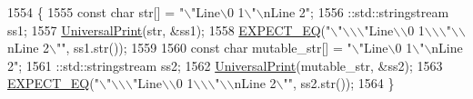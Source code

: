 \begin{DoxyCode}
1554                                             \{
1555   \textcolor{keyword}{const} \textcolor{keywordtype}{char} str[] = \textcolor{stringliteral}{"\(\backslash\)"Line\(\backslash\)0 1\(\backslash\)"\(\backslash\)nLine 2"};
1556   ::std::stringstream ss1;
1557   \hyperlink{namespacetesting_1_1internal_ad121a890bddf866e59605d1a0198dada}{UniversalPrint}(str, &ss1);
1558   \hyperlink{gtest_8h_a4159019abda84f5366acdb7604ff220a}{EXPECT\_EQ}(\textcolor{stringliteral}{"\(\backslash\)"\(\backslash\)\(\backslash\)\(\backslash\)"Line\(\backslash\)\(\backslash\)0 1\(\backslash\)\(\backslash\)\(\backslash\)"\(\backslash\)\(\backslash\)nLine 2\(\backslash\)""}, ss1.str());
1559 
1560   \textcolor{keyword}{const} \textcolor{keywordtype}{char} mutable\_str[] = \textcolor{stringliteral}{"\(\backslash\)"Line\(\backslash\)0 1\(\backslash\)"\(\backslash\)nLine 2"};
1561   ::std::stringstream ss2;
1562   \hyperlink{namespacetesting_1_1internal_ad121a890bddf866e59605d1a0198dada}{UniversalPrint}(mutable\_str, &ss2);
1563   \hyperlink{gtest_8h_a4159019abda84f5366acdb7604ff220a}{EXPECT\_EQ}(\textcolor{stringliteral}{"\(\backslash\)"\(\backslash\)\(\backslash\)\(\backslash\)"Line\(\backslash\)\(\backslash\)0 1\(\backslash\)\(\backslash\)\(\backslash\)"\(\backslash\)\(\backslash\)nLine 2\(\backslash\)""}, ss2.str());
1564 \}
\end{DoxyCode}

